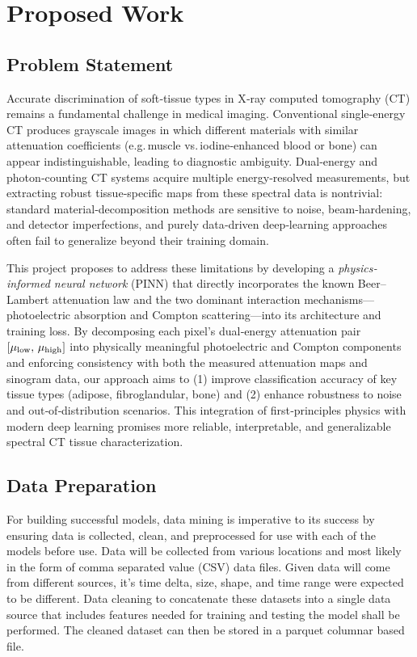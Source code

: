\section{Proposed Work}\label{sec:proposed_work}

\subsection{Problem Statement}\label{subsec:problem_Statement}

Accurate discrimination of soft‐tissue types in X‐ray computed tomography (CT) remains a
fundamental challenge in medical imaging. Conventional single‐energy CT produces grayscale
images in which different materials with similar attenuation coefficients (e.g.\,muscle 
vs.\,iodine‐enhanced blood or bone) can appear indistinguishable, leading to diagnostic 
ambiguity. Dual‐energy and photon‐counting CT systems acquire multiple energy‐resolved 
measurements, but extracting robust tissue‐specific maps from these spectral data is 
nontrivial: standard material‐decomposition methods are sensitive to noise, beam‐hardening, 
and detector imperfections, and purely data‐driven deep‐learning approaches often fail to 
generalize beyond their training domain.

This project proposes to address these limitations by developing a \emph{physics‐informed neural network} 
(PINN) that directly incorporates the known Beer–Lambert attenuation law and the two dominant 
interaction mechanisms—photoelectric absorption and Compton scattering—into its architecture 
and training loss. By decomposing each pixel’s dual‐energy attenuation pair \([\mu_{\rm low},\,
\mu_{\rm high}]\) into physically meaningful photoelectric and Compton components and enforcing 
consistency with both the measured attenuation maps and sinogram data, our approach aims to (1)
improve classification accuracy of key tissue types (adipose, fibroglandular, bone) and (2) 
enhance robustness to noise and out‐of‐distribution scenarios. This integration of first‐principles 
physics with modern deep learning promises more reliable, interpretable, and generalizable 
spectral CT tissue characterization.

\subsection{Data Preparation}\label{sec:data_preparation}

For building successful models, data mining is imperative to its success by ensuring data is collected,
clean, and preprocessed for use with each of the models before use. Data will be collected from various
locations and most likely in the form of comma separated value (CSV) data files. Given data will come
from different sources, it's time delta, size, shape, and time range were expected to be different. 
Data cleaning to concatenate these datasets into a single data source that includes features needed for
training and testing the model shall be performed. The cleaned dataset can then be stored in a parquet
columnar based file. 

